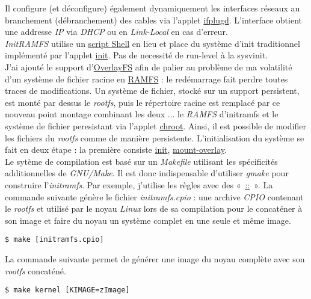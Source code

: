 \documentclass[a4paper]{article}
\begin{document}
Il configure (et déconfigure) également dynamiquement les interfaces réseaux au branchement (débranchement) des cables via l'applet \href{http://www.busybox.net/downloads/BusyBox.html#ifplugd}{ifplugd}. L'interface obtient une addresse \textit{IP} via \textit{DHCP} ou en \textit{Link-Local} en cas d'erreur.\\

\textit{InitRAMFS} utilise un \href{https://github.com/gazoo74/initramfs/blob/master/packages-initramfs/ramfs/etc/init}{script Shell} en lieu et place du système d'init traditionnel implémenté par l'applet \href{http://www.busybox.net/downloads/BusyBox.html#init}{init}. Pas de necessité de run-level à la sysvinit.\\

J'ai ajouté le support d'\href{https://www.kernel.org/doc/Documentation/filesystems/overlayfs.txt}{OverlayFS} afin de palier au problème de ma volatilité d'un système de fichier racine en \href{https://fr.wikipedia.org/wiki/Ramfs}{RAMFS} : le redémarrage fait perdre toutes traces de modifications. Un système de fichier, stocké sur un support persistent, est monté par dessus le \textit{rootfs}, puis le répertoire racine est remplacé par ce nouveau point montage combinant les deux ... le \textit{RAMFS} d'initramfs et le système de fichier peresistant via l'applet \href{http://www.busybox.net/downloads/BusyBox.html##chroot}{chroot}. Ainsi, il est possible de modifier les fichiers du \textit{rootfs} comme de manière persistente. L'initialisation du système se fait en deux étape : la première consiste
\href{https://github.com/gazoo74/initramfs/blob/master/packages-initramfs/overlay/init}{init}, \href{https://github.com/gazoo74/initramfs/blob/master/packages-initramfs/overlay/etc/init.d/mount-overlay}{mount-overlay}.\\

Le sytème de compilation est basé sur un \textit{Makefile} utilisant les spécificités additionnelles de \textit{GNU/Make}. Il est donc indispensable d'utiliser \textit{gmake} pour construire l'\textit{initramfs}. Par exemple, j'utilise les règles avec des «~\href{https://www.gnu.org/software/make/manual/html_node/Double_002dColon.html}{::}~».
La commande suivante génère le fichier \textit{initramfs.cpio} : une archive \textit{CPIO} contenant le \textit{rootfs} et utilisé par le noyau \textit{Linux} lors de sa compilation pour le concaténer à son image et faire du noyau un système complet en une seule et même image.
\begin{verbatim}
$ make [initramfs.cpio]
\end{verbatim}
La commande suivante permet de générer une image du noyau complète avec son \textit{rootfs} concaténé.
\begin{verbatim}
$ make kernel [KIMAGE=zImage]
\end{verbatim}
\end{document}
